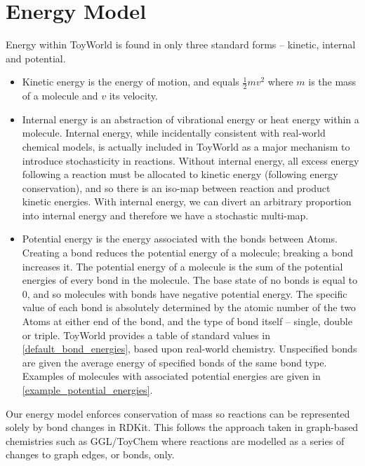 \section{Energy Model}\label{energy-model}

Energy within ToyWorld is found in only three standard forms -- kinetic,
internal and potential.

\begin{itemize}
	\item
 Kinetic energy is the energy of motion, and equals $\frac{1}{2}mv^2$
 where $m$ is the mass of a molecule and $v$ its velocity.
	\item
 Internal energy is an abstraction of vibrational energy or heat energy
 within a molecule. Internal energy, while incidentally consistent with
 real-world chemical models, is actually included in ToyWorld as a
 major mechanism to introduce stochasticity in reactions. Without
 internal energy, all excess energy following a reaction must be
 allocated to kinetic energy (following energy conservation), and so
 there is an iso-map between reaction and product kinetic energies.
 With internal energy, we can divert an arbitrary proportion into
 internal energy and therefore we have a stochastic multi-map.
	\item
 Potential energy is the energy associated with the bonds between
 Atoms. Creating a bond reduces the potential energy of a molecule;
 breaking a bond increases it. The potential energy of a molecule is
 the sum of the potential energies of every bond in the molecule. The
 base state of no bonds is equal to $0$, and so molecules with bonds
 have negative potential energy. The specific value of each bond is
 absolutely determined by the atomic number of the two Atoms at either
 end of the bond, and the type of bond itself -- single, double or
 triple. ToyWorld provides a table of standard values in
 \cref{default_bond_energies}, based upon real-world chemistry.
 Unspecified bonds are given the average energy of specified bonds of
 the same bond type. Examples of molecules with associated potential
 energies are given in \cref{example_potential_energies}.
\end{itemize}

Our energy model enforces conservation of mass so reactions can be
represented solely by bond changes in RDKit. This follows the approach
taken in graph-based chemistries such as GGL/ToyChem
\autocite{Benko2003,Benko2005} where reactions are modelled as a series
of changes to graph edges, or bonds, only.

